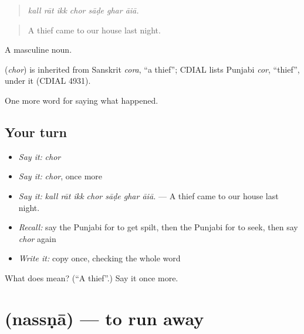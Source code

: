 \begin{quote}
      
\end{quote}

\begin{quote}
\emph{kall rāt ikk chor sāḍe ghar āiā.}
\end{quote}

\begin{quote}
A thief came to our house last night.
\end{quote}

A masculine noun.

\begin{cousinweb}
\textbf{} (\emph{chor}) is inherited from Sanskrit \emph{cora}, \textquotedblleft{}a thief\textquotedblright{}; CDIAL lists Punjabi \emph{cor}, \textquotedblleft{}thief\textquotedblright{}, under it (CDIAL 4931).
\end{cousinweb}

\begin{grammarlens}[title={What you've built}]
One more word for saying what happened.
\end{grammarlens}

\subsection*{Your turn}
\begin{itemize}
\raggedright
  \item \emph{Say it:} \emph{chor}
  \item \emph{Say it:} \emph{chor}, once more
  \item \emph{Say it:} \emph{kall rāt ikk chor sāḍe ghar āiā.} — A thief came to our house last night.
  \item \emph{Recall:} say the Punjabi for to get spilt, then the Punjabi for to seek, then say \emph{chor} again
  \item \emph{Write it:} copy \textbf{} once, checking the whole word
\end{itemize}

\begin{tcolorbox}[breakable,colback=teal!4,colframe=teal!35!black,title={Before you move on}]
What does  mean? (\textquotedblleft{}A thief\textquotedblright{}.) Say it once more.
\end{tcolorbox}
\section[\texorpdfstring{\pa{ਨੱਸਣਾ} (nassṇā)}{ਨੱਸਣਾ (nassṇā)}]{ (nassṇā) — to run away}

